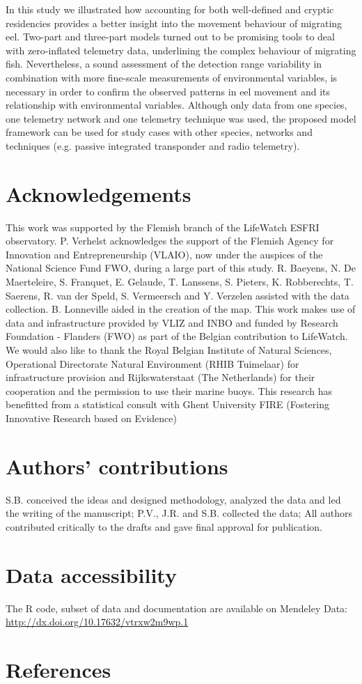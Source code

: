 \documentclass[preprint,12pt,authoryear]{elsarticle}
\newcommand{\ackname}{Acknowledgements}
\newcommand{\autcont}{Authors’ contributions}
\newcommand{\datacc}{Data accessibility}
\begin{document}
In this study we illustrated how accounting for both well-defined and cryptic residencies provides a better insight into the movement behaviour of migrating eel. Two-part and three-part models turned out to be promising tools to deal with zero-inflated telemetry data, underlining the complex behaviour of migrating fish. Nevertheless, a sound assessment of the detection range variability in combination with more fine-scale measurements of environmental variables, is necessary in order to confirm the observed patterns in eel movement and its relationship with environmental variables. Although only data from one species, one telemetry network and one telemetry technique was used, the proposed model framework can be used for study cases with other species, networks and techniques (e.g. passive integrated transponder and radio telemetry). 


\section*{\ackname}

This work was supported by the Flemish branch of the LifeWatch ESFRI observatory. P. Verhelst acknowledges the support of the Flemish Agency for Innovation and
Entrepreneurship (VLAIO), now under the auspices of the National Science Fund FWO, during a large part of this study. R. Baeyens, N. De Maerteleire, S. Franquet, E. Gelaude, T. Lanssens, S. Pieters, K. Robberechts, T. Saerens, R. van der Speld, S. Vermeersch and Y. Verzelen assisted with the data collection. B. Lonneville aided in the creation of the map. This work makes use of data and infrastructure provided by VLIZ and INBO and funded by Research Foundation - Flanders (FWO) as part of the Belgian contribution to LifeWatch. We would also like to thank the Royal Belgian Institute of Natural Sciences, Operational Directorate Natural Environment (RHIB Tuimelaar) for infrastructure provision and Rijkswaterstaat (The Netherlands) for their cooperation and the permission to use their marine buoys. This research has benefitted from a statistical consult with Ghent University FIRE (Fostering Innovative Research based on Evidence)

\section*{\autcont}

S.B. conceived the ideas and designed methodology, analyzed the data and led the writing of the manuscript; P.V., J.R. and S.B. collected the data; All authors contributed critically to the drafts and gave final approval for publication.

\section*{\datacc}

The R code, subset of data and documentation are available on Mendeley Data: \url{http://dx.doi.org/10.17632/vtrxw2m9wp.1}

\newpage

\section{References}




\newpage



\end{document}
